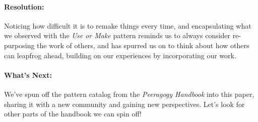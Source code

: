 \paragraph{Resolution:} Noticing how difficult it is to remake things every time, and encapsulating what we observed with the \emph{Use or Make} pattern reminds us to always consider re-purposing the work of others, and has spurred us on to think about how others can leapfrog ahead, building on our experiences by incorporating our work.

\paragraph{What's Next:} We've spun off the pattern catalog from the \emph{Peeragogy Handbook} into this paper, sharing it with a new community and gaining new perspectives.  Let's look for other parts of the handbook we can spin off!
